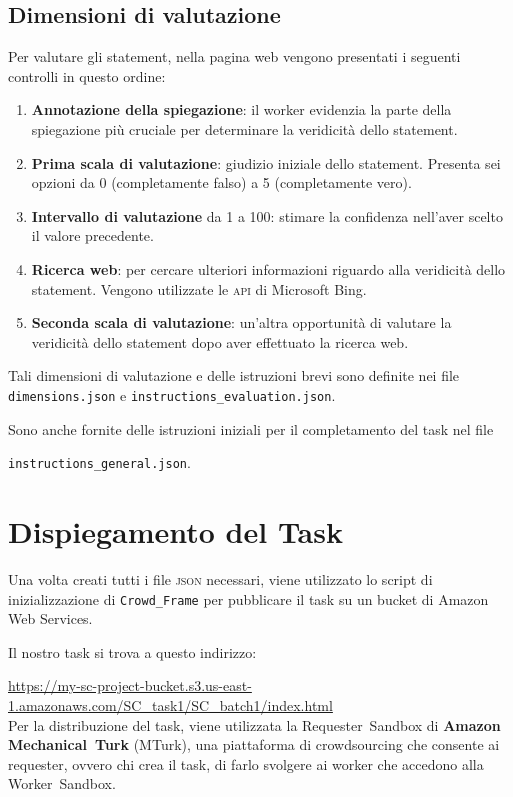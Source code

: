\documentclass[a4paper, 11pt, twoside]{article}
\begin{document}
\subsection{Dimensioni di valutazione}
Per valutare gli statement, nella pagina web vengono presentati i seguenti controlli in questo ordine:
\begin{enumerate}
    \item \textbf{Annotazione della spiegazione}: il worker evidenzia la parte della spiegazione più cruciale per determinare la veridicità dello statement.
    \item \textbf{Prima scala di valutazione}: giudizio iniziale dello statement. Presenta sei opzioni da 0 (completamente falso) a 5 (completamente vero).
    \item \textbf{Intervallo di valutazione} da 1 a 100: stimare la confidenza nell'aver scelto il valore precedente.
    \item \textbf{Ricerca web}: per cercare ulteriori informazioni riguardo alla veridicità dello statement. Vengono utilizzate le \textsc{api} di Microsoft Bing.
    \item \textbf{Seconda scala di valutazione}: un'altra opportunità di valutare la veridicità dello statement dopo aver effettuato la ricerca web.
\end{enumerate}
Tali dimensioni di valutazione e delle istruzioni brevi sono definite nei file \texttt{dimensions.json} e \texttt{instructions\_evaluation.json}.

Sono anche fornite delle istruzioni iniziali per il completamento del task nel file

\texttt{instructions\_general.json}.

\section{Dispiegamento del Task}
Una volta creati tutti i file \textsc{json} necessari, viene utilizzato lo script di inizializzazione di \texttt{Crowd\_Frame} per pubblicare il task su un bucket di Amazon Web Services.

Il nostro task si trova a questo indirizzo:

\url{https://my-sc-project-bucket.s3.us-east-1.amazonaws.com/SC\_task1/SC\_batch1/index.html} \\

Per la distribuzione del task, viene utilizzata la Requester~Sandbox di \textbf{Amazon Mechanical~Turk} (MTurk), una piattaforma di crowdsourcing che consente ai requester, ovvero chi crea il task, di farlo svolgere ai worker che accedono alla Worker~Sandbox. \\
\end{document}
